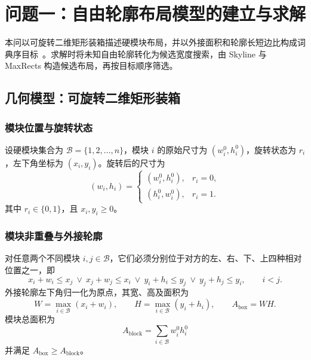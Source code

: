 \section{问题一：自由轮廓布局模型的建立与求解}

本问以可旋转二维矩形装箱描述硬模块布局，并以外接面积和轮廓长短边比构成词典序目标~\cite{wong1989}。求解时将未知自由轮廓转化为候选宽度搜索，由 Skyline 与 MaxRects 构造候选布局，再按目标顺序筛选。

\subsection{几何模型：可旋转二维矩形装箱}

\subsubsection{模块位置与旋转状态}

设硬模块集合为 $\mathcal{B}=\{1,2,\ldots,n\}$，模块 $i$ 的原始尺寸为 $(w_i^0,h_i^0)$，旋转状态为 $r_i$，左下角坐标为 $(x_i,y_i)$。旋转后的尺寸为
\begin{equation}
  (w_i,h_i)=
  \begin{cases}
    (w_i^0,h_i^0), & r_i=0,\\
    (h_i^0,w_i^0), & r_i=1.
  \end{cases}
  \label{eq:q1_rotation}
\end{equation}
其中 $r_i\in\{0,1\}$，且 $x_i,y_i\ge0$。

\subsubsection{模块非重叠与外接轮廓}

对任意两个不同模块 $i,j\in\mathcal{B}$，它们必须分别位于对方的左、右、下、上四种相对位置之一，即
\begin{equation}
  x_i+w_i\le x_j
  \ \vee\ 
  x_j+w_j\le x_i
  \ \vee\ 
  y_i+h_i\le y_j
  \ \vee\ 
  y_j+h_j\le y_i,
  \qquad i<j.
  \label{eq:q1_nonoverlap}
\end{equation}
外接轮廓左下角归一化为原点，其宽、高及面积为
\begin{equation}
  W=\max_{i\in\mathcal{B}}(x_i+w_i),\qquad
  H=\max_{i\in\mathcal{B}}(y_i+h_i),\qquad
  A_{\mathrm{box}}=WH.
  \label{eq:q1_outline}
\end{equation}
模块总面积为
\begin{equation}
  A_{\mathrm{block}}=\sum_{i\in\mathcal{B}}w_i^0h_i^0
  \label{eq:q1_area_lb}
\end{equation}
并满足 $A_{\mathrm{box}}\ge A_{\mathrm{block}}$。

